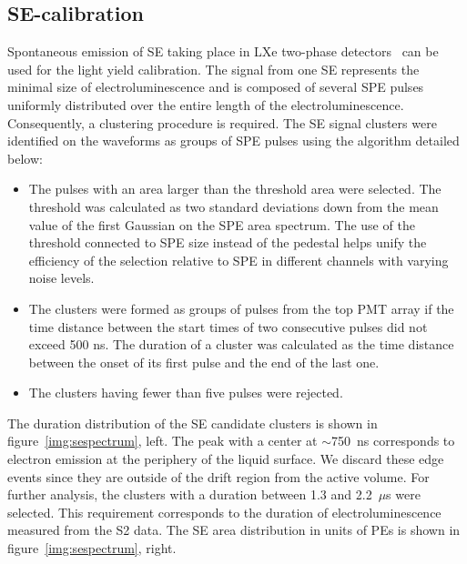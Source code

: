 \documentclass[a4paper,11pt]{article}
\begin{document}
\subsection{SE-calibration}
\label{subsec:SE}

Spontaneous emission of SE taking place in LXe two-phase detectors~\cite{Akimov:2012zz,Akimov_2016_delayed_electrons, PhysRevD.102.092004, Kopec_2021} can be used for the light yield calibration.
The signal from one SE represents the minimal size of electroluminescence and is composed of several SPE pulses uniformly distributed over the entire length of the electroluminescence. 
Consequently, a clustering procedure is required. The SE signal clusters were identified on the waveforms as groups of SPE pulses using the algorithm detailed below:

\begin{itemize}
    \item 
    The pulses with an area larger than the threshold area were selected. 
    The threshold was calculated as two standard deviations down from the mean value of the first Gaussian on the SPE area spectrum. The use of the threshold connected to SPE size instead of the pedestal helps unify the efficiency of the selection relative to SPE in different channels with varying noise levels.
    \item 
    The clusters were formed as groups of pulses from the top PMT array if the time distance between the start times of two consecutive pulses did not exceed 500 ns.
    The duration of a cluster was calculated as the time distance between the onset of its first pulse and the end of the last one.
    \item The clusters having fewer than five pulses were rejected.
\end{itemize}

The duration distribution of the SE candidate clusters is shown in figure~\ref{img:sespectrum}, left.
The peak with a center at $\sim$750~ns corresponds to electron emission at the periphery of the liquid surface.
We discard these edge events since they are outside of the drift region from the active volume. 
For further analysis, the clusters with a duration between 1.3 and 2.2~$\mu$s were selected.
This requirement corresponds to the duration of electroluminescence measured from the S2 data. The SE area distribution in units of PEs is shown in figure~\ref{img:sespectrum}, right.
\end{document}
